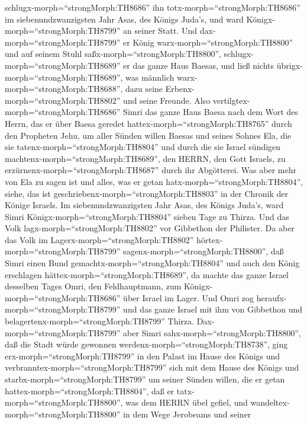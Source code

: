schlugx-morph=``strongMorph:TH8686'' ihn
totx-morph=``strongMorph:TH8686'' im siebenundzwanzigsten Jahr Asas, des
Königs Juda's, und ward Königx-morph=``strongMorph:TH8799'' an seiner
Statt.  Und dax-morph=``strongMorph:TH8799'' er König
warx-morph=``strongMorph:TH8800'' und auf seinem Stuhl
saßx-morph=``strongMorph:TH8800'', schlugx-morph=``strongMorph:TH8689''
er das ganze Haus Baesas, und ließ nichts
übrigx-morph=``strongMorph:TH8689'', was männlich
warx-morph=``strongMorph:TH8688'', dazu seine
Erbenx-morph=``strongMorph:TH8802'' und seine Freunde. 
Also vertilgtex-morph=``strongMorph:TH8686'' Simri das ganze Haus Baesa
nach dem Wort des Herrn, das er über Baesa geredet
hattex-morph=``strongMorph:TH8765'' durch den Propheten Jehu,
 um aller Sünden willen Baesas und seines Sohnes Ela, die
sie tatenx-morph=``strongMorph:TH8804'' und durch die sie Israel
sündigen machtenx-morph=``strongMorph:TH8689'', den HERRN, den Gott
Israels, zu erzürnenx-morph=``strongMorph:TH8687'' durch ihr Abgötterei.
 Was aber mehr von Ela zu sagen ist und alles, was er getan
hatx-morph=``strongMorph:TH8804'', siehe, das ist
geschriebenx-morph=``strongMorph:TH8803'' in der Chronik der Könige
Israels.  Im siebenundzwanzigsten Jahr Asas, des Königs
Juda's, ward Simri Königx-morph=``strongMorph:TH8804'' sieben Tage zu
Thirza. Und das Volk lagx-morph=``strongMorph:TH8802'' vor Gibbethon der
Philister.  Da aber das Volk im
Lagerx-morph=``strongMorph:TH8802'' hörtex-morph=``strongMorph:TH8799''
sagenx-morph=``strongMorph:TH8800'', daß Simri einen Bund
gemachtx-morph=``strongMorph:TH8804'' und auch den König erschlagen
hättex-morph=``strongMorph:TH8689'', da machte das ganze Israel
desselben Tages Omri, den Feldhauptmann, zum
Königx-morph=``strongMorph:TH8686'' über Israel im Lager. 
Und Omri zog heraufx-morph=``strongMorph:TH8799'' und das ganze Israel
mit ihm von Gibbethon und belagertenx-morph=``strongMorph:TH8799''
Thirza.  Dax-morph=``strongMorph:TH8799'' aber Simri
sahx-morph=``strongMorph:TH8800'', daß die Stadt würde gewonnen
werdenx-morph=``strongMorph:TH8738'', ging
erx-morph=``strongMorph:TH8799'' in den Palast im Hause des Königs und
verbranntex-morph=``strongMorph:TH8799'' sich mit dem Hause des Königs
und starbx-morph=``strongMorph:TH8799''  um seiner Sünden
willen, die er getan hattex-morph=``strongMorph:TH8804'', daß er
tatx-morph=``strongMorph:TH8800'', was dem HERRN übel gefiel, und
wandeltex-morph=``strongMorph:TH8800'' in dem Wege Jerobeams und seiner
